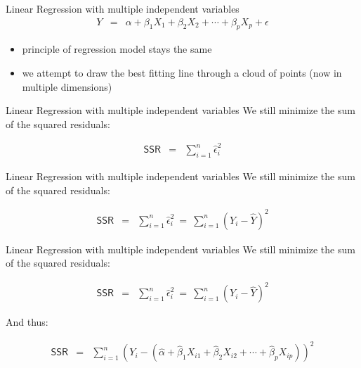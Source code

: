 \documentclass[presentation]{beamer}
\begin{document}
\begin{frame}[label={sec:orgdba9809}]{Linear Regression with multiple independent variables}
\begin{eqnarray*}
      Y & = & \alpha + \beta_1 X_1 + \beta_2 X_2 + \cdots + \beta_p X_p + \epsilon
\end{eqnarray*}

\begin{itemize}
\item principle of regression model stays the same

\item we attempt to draw the best fitting line through a cloud of points (now in multiple dimensions)
\end{itemize}
\end{frame}

\begin{frame}[label={sec:orgbf3fce9}]{Linear Regression with multiple independent variables}
We still minimize the sum of the squared residuals:

\begin{eqnarray*}
      \textsf{SSR} & = & \sum_{i=1}^n \hat\epsilon_i^2
    \end{eqnarray*}
\end{frame}


\begin{frame}[label={sec:orga1983ff}]{Linear Regression with multiple independent variables}
We still minimize the sum of the squared residuals:

\begin{eqnarray*}
      \textsf{SSR} & = & \sum_{i=1}^n \hat\epsilon_i^2 \ = \ \sum_{i=1}^n
                         (Y_i - \hat{Y})^2
    \end{eqnarray*}
\end{frame}


\begin{frame}[label={sec:org3fa422a}]{Linear Regression with multiple independent variables}
We still minimize the sum of the squared residuals:


\begin{eqnarray*}
      \textsf{SSR} & = & \sum_{i=1}^n \hat\epsilon_i^2 \ = \ \sum_{i=1}^n
                         (Y_i - \hat{Y})^2
    \end{eqnarray*}

And thus:

\begin{eqnarray*}

 \textsf{SSR} &=& \sum_{i=1}^n (Y_i - (\hat\alpha + \hat\beta_1 X_{i1} +
                         \hat\beta_2 X_{i2} + \cdots + \hat\beta_p X_{ip}))^2
    \end{eqnarray*}
\end{frame}
\end{document}

